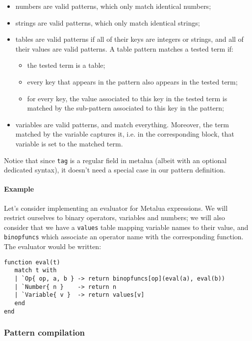 \begin{itemize}
\item numbers are valid patterns, which only match identical numbers;
\item strings are valid patterns, which only match identical strings;
\item tables are valid patterns if all of their keys are integers or
  strings, and all of their values are valid patterns. A table pattern
  matches a tested term if:
  \begin{itemize}
  \item the tested term is a table;
  \item every key that appears in the pattern also appears in the
    tested term;
  \item for every key, the value associated to this key in the tested
    term is matched by the sub-pattern associated to this key in the
    pattern;
  \end{itemize}
\item variables are valid patterns, and match everything. Moreover,
  the term matched by the variable captures it, i.e. in the
  corresponding block, that variable is set to the
  matched term.
\end{itemize}

Notice that since \verb|tag| is a regular field in metalua (albeit
with an optional dedicated syntax), it doesn't need a special case in
our pattern definition.

\paragraph{Example} Let's consider implementing an evaluator for
Metalua expressions. We will restrict ourselves to binary operators,
variables and numbers; we will also consider that we have a
\verb|values| table mapping variable names to their value, and
\verb|binopfuncs| which associate an operator name with the corresponding
function. The evaluator would be written:

\begin{verbatim}
function eval(t)
   match t with
   | `Op{ op, a, b } -> return binopfuncs[op](eval(a), eval(b))
   | `Number{ n }    -> return n
   | `Variable{ v }  -> return values[v]
   end
end
\end{verbatim}

\subsubsection{Pattern compilation}

